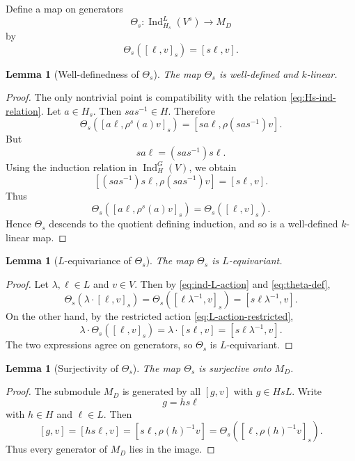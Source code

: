 \documentclass[11pt]{article}
\newtheorem{lemma}[theorem]{Lemma}
\theoremstyle{definition}
\newcommand{\Ind}{\operatorname{Ind}}
\begin{document}
Define a map on generators
\[
  \Theta_s : \Ind_{H_s}^{L}(V^s) \longrightarrow M_D
\]
by
\begin{equation}\label{eq:theta-def}
  \Theta_s([\ell,v]_s)=[s\ell,v].
\end{equation}

\begin{lemma}[Well-definedness of $\Theta_s$]\label{lem:theta-well-defined}
The map $\Theta_s$ is well-defined and $k$-linear.
\end{lemma}

\begin{proof}
The only nontrivial point is compatibility with the relation \eqref{eq:Hs-ind-relation}. Let $a\in H_s$. Then $sas^{-1}\in H$. Therefore
\[
  \Theta_s([a\ell,\rho^s(a)v]_s)
  =
  [sa\ell,\rho(sas^{-1})v].
\]
But
\[
  sa\ell=(sas^{-1})s\ell.
\]
Using the induction relation in $\Ind_H^G(V)$, we obtain
\[
  [(sas^{-1})s\ell,\rho(sas^{-1})v]
  =
  [s\ell,v].
\]
Thus
\[
  \Theta_s([a\ell,\rho^s(a)v]_s)
  =
  \Theta_s([\ell,v]_s).
\]
Hence $\Theta_s$ descends to the quotient defining induction, and so is a well-defined $k$-linear map.
\end{proof}

\begin{lemma}[$L$-equivariance of $\Theta_s$]\label{lem:theta-equivariant}
The map $\Theta_s$ is $L$-equivariant.
\end{lemma}

\begin{proof}
Let $\lambda,\ell\in L$ and $v\in V$. Then by \eqref{eq:ind-L-action} and \eqref{eq:theta-def},
\[
  \Theta_s(\lambda\cdot[\ell,v]_s)
  =
  \Theta_s([\ell\lambda^{-1},v]_s)
  =
  [s\ell\lambda^{-1},v].
\]
On the other hand, by the restricted action \eqref{eq:L-action-restricted},
\[
  \lambda\cdot\Theta_s([\ell,v]_s)
  =
  \lambda\cdot[s\ell,v]
  =
  [s\ell\lambda^{-1},v].
\]
The two expressions agree on generators, so $\Theta_s$ is $L$-equivariant.
\end{proof}

\begin{lemma}[Surjectivity of $\Theta_s$]\label{lem:theta-surj}
The map $\Theta_s$ is surjective onto $M_D$.
\end{lemma}

\begin{proof}
The submodule $M_D$ is generated by all $[g,v]$ with $g\in HsL$. Write
\[
  g=hs\ell
\]
with $h\in H$ and $\ell\in L$. Then
\[
  [g,v]
  =
  [hs\ell,v]
  =
  [s\ell,\rho(h)^{-1}v]
  =
  \Theta_s([\ell,\rho(h)^{-1}v]_s).
\]
Thus every generator of $M_D$ lies in the image.
\end{proof}
\end{document}
